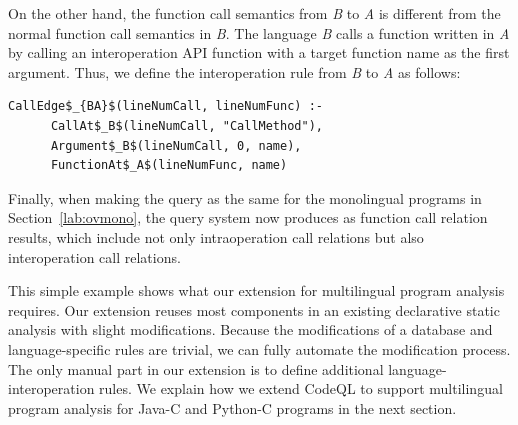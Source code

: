 \noindent
On the other hand, the function call semantics from {\it B} to {\it A} is
different from the normal function call semantics in {\it B}. The language {\it
B} calls a function written in {\it A} by calling an interoperation API
function  with a target function name as the first argument.
Thus, we define the interoperation rule from {\it B} to {\it A} as follows:

\begin{lstlisting}[style=mrule]
    CallEdge$_{BA}$(lineNumCall, lineNumFunc) :-
      CallAt$_B$(lineNumCall, "CallMethod"),
      Argument$_B$(lineNumCall, 0, name),
      FunctionAt$_A$(lineNumFunc, name)
\end{lstlisting}

Finally, when making the query  as the same for the
monolingual programs in Section~\ref{lab:ovmono}, the query system now produces
  as function call
relation results, which include not only intraoperation call relations but also
interoperation call relations.

This simple example shows what our extension for multilingual program analysis
requires. Our extension reuses most components in an existing declarative
static analysis with slight modifications. Because the modifications of a
database and language-specific rules are trivial, we can fully automate the
modification process.  The only manual part in our extension is to define
additional language-interoperation rules. We explain how we extend CodeQL to
support multilingual program analysis for Java-C and Python-C programs in the
next section.
